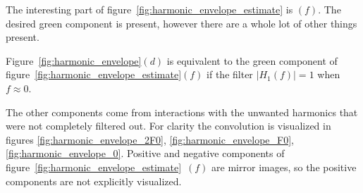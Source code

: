\documentclass [11pt, proquest,oneside] {ganter_thesis}[2015/03/03]
\begin{document}
The interesting part of figure~\ref{fig:harmonic_envelope_estimate} is $(f)$.  The desired green component is present, however there are a whole lot of other things present.

Figure~\ref{fig:harmonic_envelope}$(d)$ is equivalent to the green component of  figure~\ref{fig:harmonic_envelope_estimate}$(f)$ if the filter $|H_1(f)| = 1$ when $f \approx 0$.

The other components come from interactions with the unwanted harmonics that were not completely filtered out.  For clarity the convolution is visualized in figures \ref{fig:harmonic_envelope_2F0}, \ref{fig:harmonic_envelope_F0}, \ref{fig:harmonic_envelope_0}.  Positive and negative components of figure~\ref{fig:harmonic_envelope_estimate}~$(f)$ are mirror images, so the positive components are not explicitly visualized.
\end{document}

